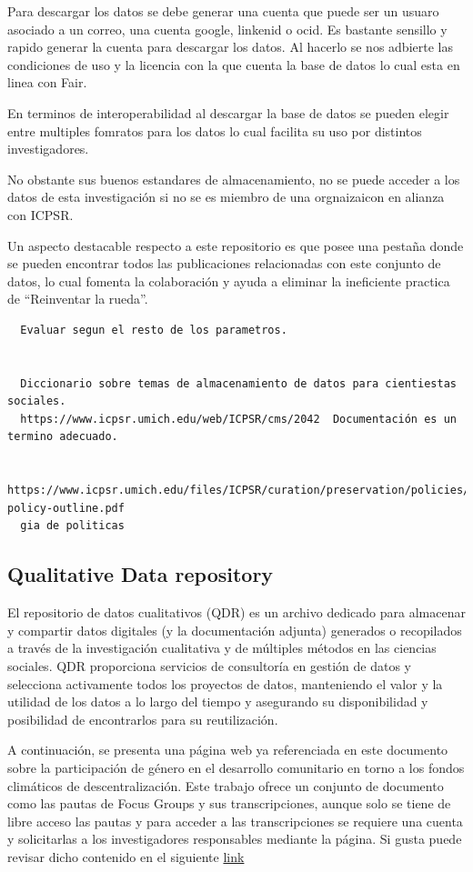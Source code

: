 \documentclass[
  14pt,
]{book}
\begin{document}
Para descargar los datos se debe generar una cuenta que puede ser un usuaro asociado a un correo, una cuenta google, linkenid o ocid. Es bastante sensillo y rapido generar la cuenta para descargar los datos. Al hacerlo se nos adbierte las condiciones de uso y la licencia con la que cuenta la base de datos lo cual esta en linea con Fair.

En terminos de interoperabilidad al descargar la base de datos se pueden elegir entre multiples fomratos para los datos lo cual facilita su uso por distintos investigadores.

No obstante sus buenos estandares de almacenamiento, no se puede acceder a los datos de esta investigación si no se es miembro de una orgnaizaicon en alianza con ICPSR.

Un aspecto destacable respecto a este repositorio es que posee una pestaña donde se pueden encontrar todos las publicaciones relacionadas con este conjunto de datos, lo cual fomenta la colaboración y ayuda a eliminar la ineficiente practica de ``Reinventar la rueda''.

\begin{verbatim}
  Evaluar segun el resto de los parametros. 
  
  
  Diccionario sobre temas de almacenamiento de datos para cientiestas sociales. 
  https://www.icpsr.umich.edu/web/ICPSR/cms/2042  Documentación es un termino adecuado.     
  
  https://www.icpsr.umich.edu/files/ICPSR/curation/preservation/policies/dp-policy-outline.pdf 
  gia de politicas
\end{verbatim}

\hypertarget{qualitative-data-repository}{%
\subsection{Qualitative Data repository}\label{qualitative-data-repository}}

El repositorio de datos cualitativos (QDR) es un archivo dedicado para almacenar y compartir datos digitales (y la documentación adjunta) generados o recopilados a través de la investigación cualitativa y de múltiples métodos en las ciencias sociales. QDR proporciona servicios de consultoría en gestión de datos y selecciona activamente todos los proyectos de datos, manteniendo el valor y la utilidad de los datos a lo largo del tiempo y asegurando su disponibilidad y posibilidad de encontrarlos para su reutilización.

A continuación, se presenta una página web ya referenciada en este documento sobre la participación de género en el desarrollo comunitario en torno a los fondos climáticos de descentralización. Este trabajo ofrece un conjunto de documento como las pautas de Focus Groups y sus transcripciones, aunque solo se tiene de libre acceso las pautas y para acceder a las transcripciones se requiere una cuenta y solicitarlas a los investigadores responsables mediante la página. Si gusta puede revisar dicho contenido en el siguiente \href{https://data.qdr.syr.edu/dataset.xhtml?persistentId=doi:10.5064/F6HTXF0H}{link}
\end{document}
